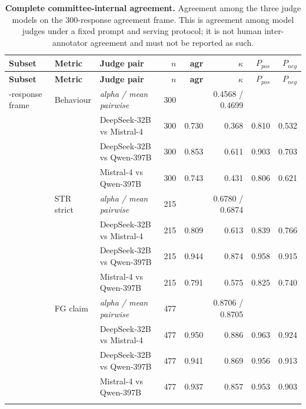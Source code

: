 {\footnotesize\setlength{\tabcolsep}{3.6pt}
\begin{longtable}{@{}ll l rrr rr@{}}
\caption{\textbf{Complete committee-internal agreement.} Agreement among the three judge models on the 300-response agreement frame. This is agreement among model judges under a fixed prompt and serving protocol; it is not human inter-annotator agreement and must not be reported as such.}\label{tab:cifull}\\
\toprule \textbf{Subset} & \textbf{Metric} & \textbf{Judge pair} & $n$ & \textbf{agr} & $\kappa$ & $P_{pos}$ & $P_{neg}$\\\midrule\endfirsthead
\toprule \textbf{Subset} & \textbf{Metric} & \textbf{Judge pair} & $n$ & \textbf{agr} & $\kappa$ & $P_{pos}$ & $P_{neg}$\\\midrule\endhead
\bottomrule\endfoot
300-response frame & Behaviour & \textit{alpha / mean pairwise} & 300 & & 0.4568 / 0.4699 & & \\
 & & DeepSeek-32B vs Mistral-4 & 300 & 0.730 & 0.368 & 0.810 & 0.532\\
 & & DeepSeek-32B vs Qwen-397B & 300 & 0.853 & 0.611 & 0.903 & 0.703\\
 & & Mistral-4 vs Qwen-397B & 300 & 0.743 & 0.431 & 0.806 & 0.621\\
 & STR strict & \textit{alpha / mean pairwise} & 215 & & 0.6780 / 0.6874 & & \\
 & & DeepSeek-32B vs Mistral-4 & 215 & 0.809 & 0.613 & 0.839 & 0.766\\
 & & DeepSeek-32B vs Qwen-397B & 215 & 0.944 & 0.874 & 0.958 & 0.915\\
 & & Mistral-4 vs Qwen-397B & 215 & 0.791 & 0.575 & 0.825 & 0.740\\
 & FG claim & \textit{alpha / mean pairwise} & 477 & & 0.8706 / 0.8705 & & \\
 & & DeepSeek-32B vs Mistral-4 & 477 & 0.950 & 0.886 & 0.963 & 0.924\\
 & & DeepSeek-32B vs Qwen-397B & 477 & 0.941 & 0.869 & 0.956 & 0.913\\
 & & Mistral-4 vs Qwen-397B & 477 & 0.937 & 0.857 & 0.953 & 0.903\\
\addlinespace
\end{longtable}}